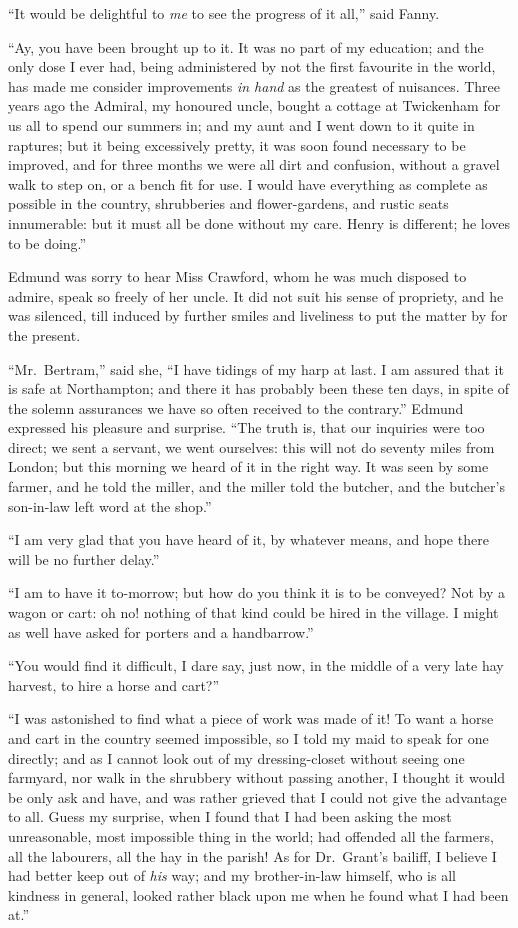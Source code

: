 \documentclass{article}
\begin{document}
``It would be delightful to \emph{me} to see the progress
of it all,'' said Fanny.

``Ay, you have been brought up to it.  It was no part of
my education; and the only dose I ever had, being administered
by not the first favourite in the world, has made me consider
improvements \emph{in hand} as the greatest of nuisances.
Three years ago the Admiral, my honoured uncle, bought a
cottage at Twickenham for us all to spend our summers in;
and my aunt and I went down to it quite in raptures;
but it being excessively pretty, it was soon found
necessary to be improved, and for three months we were
all dirt and confusion, without a gravel walk to step on,
or a bench fit for use.  I would have everything as complete
as possible in the country, shrubberies and flower-gardens,
and rustic seats innumerable:  but it must all be done
without my care.  Henry is different; he loves to be doing.''

Edmund was sorry to hear Miss Crawford, whom he was much
disposed to admire, speak so freely of her uncle.
It did not suit his sense of propriety, and he was silenced,
till induced by further smiles and liveliness to put
the matter by for the present.

``Mr.\ Bertram,'' said she, ``I have tidings of my harp at last.
I am assured that it is safe at Northampton; and there it
has probably been these ten days, in spite of the solemn
assurances we have so often received to the contrary.''
Edmund expressed his pleasure and surprise.  ``The truth is,
that our inquiries were too direct; we sent a servant,
we went ourselves:  this will not do seventy miles from London;
but this morning we heard of it in the right way.
It was seen by some farmer, and he told the miller,
and the miller told the butcher, and the butcher's
son-in-law left word at the shop.''

``I am very glad that you have heard of it, by whatever means,
and hope there will be no further delay.''

``I am to have it to-morrow; but how do you think it
is to be conveyed?  Not by a wagon or cart:  oh no!
nothing of that kind could be hired in the village.
I might as well have asked for porters and a handbarrow.''

``You would find it difficult, I dare say, just now,
in the middle of a very late hay harvest, to hire a horse
and cart?''

``I was astonished to find what a piece of work was made of it!
To want a horse and cart in the country seemed impossible,
so I told my maid to speak for one directly; and as I cannot
look out of my dressing-closet without seeing one farmyard,
nor walk in the shrubbery without passing another,
I thought it would be only ask and have, and was rather
grieved that I could not give the advantage to all.
Guess my surprise, when I found that I had been asking
the most unreasonable, most impossible thing in the world;
had offended all the farmers, all the labourers,
all the hay in the parish!  As for Dr.\ Grant's bailiff,
I believe I had better keep out of \emph{his} way; and my
brother-in-law himself, who is all kindness in general,
looked rather black upon me when he found what I had
been at.''
\end{document}
